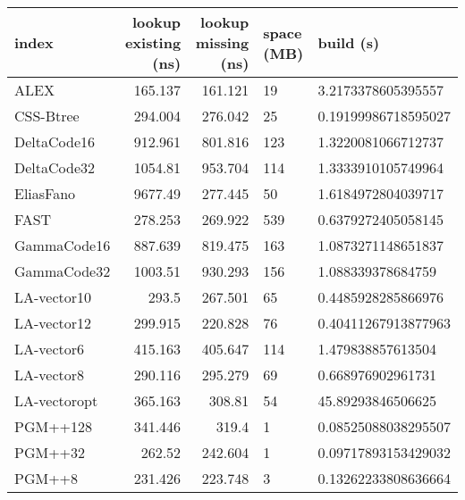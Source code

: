 \begin{tabular}{lrrll}
\hline
 index             &   lookup existing (ns) &   lookup missing (ns) & space (MB)   & build (s)             \\
\hline
 ALEX              &               165.137  &              161.121  & 19           & 3.2173378605395557    \\
 CSS-Btree         &               294.004  &              276.042  & 25           & 0.19199986718595027   \\
 DeltaCode16       &               912.961  &              801.816  & 123          & 1.3220081066712737    \\
 DeltaCode32       &              1054.81   &              953.704  & 114          & 1.3333910105749964    \\
 EliasFano         &              9677.49   &              277.445  & 50           & 1.6184972804039717    \\
 FAST              &               278.253  &              269.922  & 539          & 0.6379272405058145    \\
 GammaCode16       &               887.639  &              819.475  & 163          & 1.0873271148651837    \\
 GammaCode32       &              1003.51   &              930.293  & 156          & 1.088339378684759     \\
 LA-vector10       &               293.5    &              267.501  & 65           & 0.4485928285866976    \\
 LA-vector12       &               299.915  &              220.828  & 76           & 0.40411267913877963   \\
 LA-vector6        &               415.163  &              405.647  & 114          & 1.479838857613504     \\
 LA-vector8        &               290.116  &              295.279  & 69           & 0.668976902961731     \\
 LA-vectoropt      &               365.163  &              308.81   & 54           & 45.89293846506625     \\
 PGM++128          &               341.446  &              319.4    & 1            & 0.08525088038295507   \\
 PGM++32           &               262.52   &              242.604  & 1            & 0.09717893153429032   \\
 PGM++8            &               231.426  &              223.748  & 3            & 0.13262233808636664   \\

\end{tabular}
